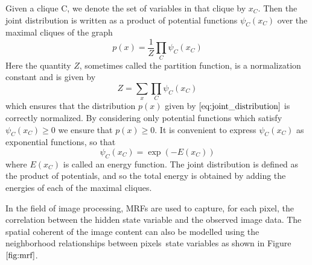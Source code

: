 \documentclass{SMBV12}
\begin{document}
Given a clique C, we denote the set of variables in that clique by $x_C$. Then the joint distribution is written as a product of potential functions $\psi_C(x_C)$ over the maximal cliques of the graph
\begin{equation}
p(x) = \frac{1}{Z} \prod\limits_{C} \psi_C(x_C)
\label{eq:joint_distribution}
\end{equation}
Here the quantity $Z$, sometimes called the partition function, is a normalization constant and is given by
\begin{equation}
Z = \sum\limits_{x} \prod\limits_{C} \psi_C(x_C)
\end{equation}
which ensures that the distribution $p(x)$ given by $\ref{eq:joint_distribution}$ is correctly normalized. By considering only potential functions which satisfy $\psi_C(x_C) \geq 0$ we ensure that $p(x) \geq 0$. It is convenient to express $\psi_C(x_C)$ as exponential functions, so that
\begin{equation}
\psi_C(x_C) = \exp \left( -E(x_C) \right) 
\end{equation}
where $E(x_C)$ is called an energy function. The joint distribution is defined as the product of potentials, and so the total energy is obtained by adding the energies of each of the maximal cliques.

In the field of image processing, MRFs are used to capture, for each pixel, the correlation between the hidden state variable and the observed image data. The spatial coherent of the image content can also be modelled using the neighborhood relationships between pixels\textquotesingle \ state variables as shown in Figure $\ref{fig:mrf}$. 
\end{document}
